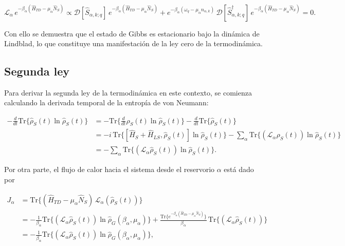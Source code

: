 \begin{appendixs}
\begin{equation*}
    \mathcal{L}_{\alpha}\,e^{-\beta_{\alpha}(\hat{H}_{TD} - \mu_{\alpha}\hat{N}_{S})} 
    \propto \mathcal{D}[\hat{S}_{\alpha,k;q}]\,e^{-\beta_{\alpha}(\hat{H}_{TD} - \mu_{\alpha}\hat{N}_{S})} 
    + e^{-\beta_{\alpha}(\omega_{q} - \mu_{\alpha}n_{\alpha,k})}\,\mathcal{D}[\hat{S}^{\dagger}_{\alpha,k;q}]\,e^{-\beta_{\alpha}(\hat{H}_{TD} - \mu_{\alpha}\hat{N}_{S})} = 0.
\end{equation*}

Con ello se demuestra que el estado de Gibbs es estacionario bajo la dinámica de Lindblad, lo que constituye una manifestación de la ley cero de la termodinámica.




\subsection{Segunda ley}

Para derivar la segunda ley de la termodinámica en este contexto, se comienza calculando la derivada temporal de la entropía de von Neumann:

\begin{align*}
    - \frac{d}{dt}\text{Tr}\{\hat{\rho}_{S}(t)\ln \hat{\rho}_{S}(t)\} 
    &=  -\text{Tr}\Big\{ \frac{d}{dt}\hat{\rho}_{S}(t)\ln \hat{\rho}_{S}(t) \Big\} - \frac{d}{dt}\text{Tr}\{\hat{\rho}_{S}(t)\} \\
    &= - i \,\text{Tr}\{[\hat{H}_{S}+\hat{H}_{LS},\hat{\rho}_{S}(t)]\ln \hat{\rho}_{S}(t)\} 
    - \sum_{\alpha} \text{Tr}\{(\mathcal{L}_{\alpha}\hat{\rho}_{S}(t)) \ln \hat{\rho}_{S}(t)\}  \\
    &= -\sum_{\alpha}\text{Tr}\{(\mathcal{L}_{\alpha}\hat{\rho}_{S}(t)) \ln \hat{\rho}_{S}(t)\}.
\end{align*}

Por otra parte, el flujo de calor hacia el sistema desde el reservorio $\alpha$ está dado por

\begin{align*}
    J_{\alpha} 
    &= \text{Tr}\{ (\hat{H}_{TD} - \mu_{\alpha}\hat{N}_{S})\,\mathcal{L}_{\alpha}(\hat{\rho}_{S}(t)) \} \\
    &= -\frac{1}{\beta_{\alpha}} \text{Tr}\{(\mathcal{L}_{\alpha}\hat{\rho}_{S}(t)) \ln \hat{\rho}_{G}(\beta_{\alpha},\mu_{\alpha}) \} 
    + \frac{\text{Tr}\{e^{-\beta_{\alpha}(\hat{H}_{TD} - \mu_{\alpha}\hat{N}_{S})}\}}{\beta_{\alpha}} \,\text{Tr}\{(\mathcal{L}_{\alpha}\hat{\rho}_{S}(t))\} \\
    &= -\frac{1}{\beta_{\alpha}} \text{Tr}\{(\mathcal{L}_{\alpha}\hat{\rho}_{S}(t))\ln \hat{\rho}_{G}(\beta_{\alpha},\mu_{\alpha}) \},
\end{align*}


\end{appendixs}
